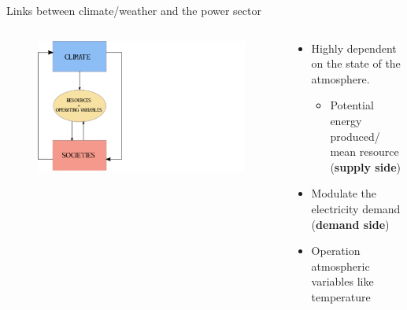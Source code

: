 \documentclass{beamer}%
\begin{document}
\begin{frame}[fragile]{Links between climate/weather and the power sector}
  \begin{columns}
    \begin{column}{0.5\textwidth}
  \begin{figure}
    \centering\includegraphics[scale=0.55]{drawing1.pdf}
\end{figure}
  \end{column}
  \begin{column}{0.5\textwidth}
    \begin{itemize}
    \item Highly dependent on the state of the atmosphere.
      \begin{itemize}
      \item Potential energy produced/ mean resource (\textbf{\alert{supply side}})
        \end{itemize}
      \item Modulate the electricity demand (\textbf{\alert{demand side}})
      \item Operation atmospheric variables like temperature   
      \end{itemize}
    \end{column}
    \end{columns}
\end{frame}
\end{document}
